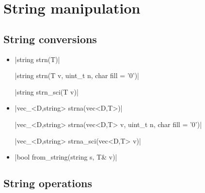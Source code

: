 \documentclass[12pt]{report}
\newcommand*\circled[1]{\tikz[baseline=(char.base)]{
            \node[shape=circle,draw,inner sep=0.0pt] (char) {#1};}}
\newcommand{\vectorfuncsym}{\circled{$\hspace{-1pt}\mathcal{V}$}\xspace}
\newcommand{\vectorfunc}{\vectorfuncsym\hspace{2pt}\xspace}
\begin{document}
\section{String manipulation \label{SEC:support:string}}

\subsection{String conversions}

\begin{itemize}
\item \cppinline|string strn(T)| 

\cppinline|string strn(T v, uint_t n, char fill = '0')|

\cppinline|string strn_sci(T v)| 

\item \cppinline|vec_<D,string> strna(vec<D,T>)| 

\cppinline|vec_<D,string> strna(vec<D,T> v, uint_t n, char fill = '0')|

\cppinline|vec_<D,string> strna_sci(vec<D,T> v)| 

\item \vectorfunc \cppinline|bool from_string(string s, T& v)| 
\end{itemize}

\subsection{String operations}
\end{document}
